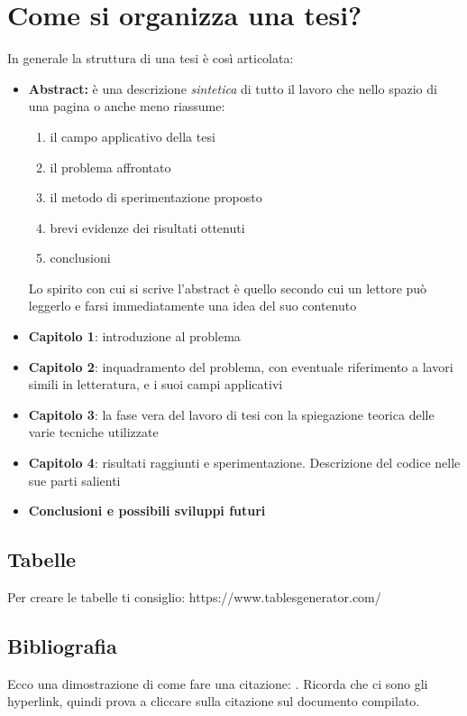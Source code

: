 \section{Come si organizza una tesi?}
In generale la struttura di una tesi è così articolata:
\begin{itemize}
    \item \textbf{Abstract:} è una descrizione \textit{sintetica} di tutto il lavoro che nello spazio di una pagina o anche meno riassume:
    \begin{enumerate}
        \item il campo applicativo della tesi
        \item il problema affrontato
        \item il metodo di sperimentazione proposto
        \item brevi evidenze dei risultati ottenuti
        \item conclusioni
    \end{enumerate}
    Lo spirito con cui si scrive l'abstract è quello secondo cui un lettore può leggerlo e farsi immediatamente una idea del suo contenuto
 \item \textbf{Capitolo 1}: introduzione al problema
 \item \textbf{Capitolo 2}: inquadramento del problema, con eventuale riferimento a lavori simili in letteratura, e i suoi campi applicativi
 \item \textbf{Capitolo 3}: la fase vera del lavoro di tesi con la spiegazione teorica delle varie tecniche utilizzate
 \item \textbf{Capitolo 4}: risultati raggiunti e sperimentazione. Descrizione del codice nelle sue parti salienti  
 \item \textbf{Conclusioni e possibili sviluppi futuri}
\end{itemize}

\subsection{Tabelle}
Per creare le tabelle ti consiglio: https://www.tablesgenerator.com/

\subsection{Bibliografia}
Ecco una dimostrazione di come fare una citazione: \cite{introduction_biometric}.  Ricorda che ci sono gli hyperlink, quindi prova a cliccare sulla citazione sul documento compilato. \\


